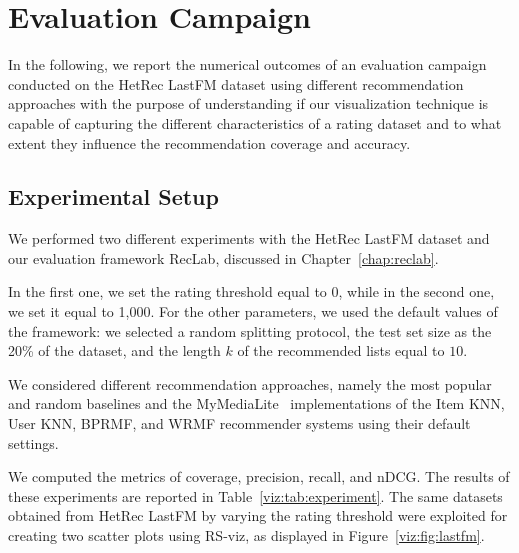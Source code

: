 \section{Evaluation Campaign}
\label{viz:sec:evaluation}

In the following, we report the numerical outcomes of an evaluation campaign conducted on the HetRec LastFM dataset using different recommendation approaches with the purpose of understanding if our visualization technique is capable of capturing the different characteristics of a rating dataset and to what extent they influence the recommendation coverage and accuracy.

\subsection{Experimental Setup}

We performed two different experiments with the HetRec LastFM dataset and our evaluation framework RecLab, discussed in Chapter~\ref{chap:reclab}.

In the first one, we set the rating threshold equal to 0, while in the second one, we set it equal to 1,000. For the other parameters, we used the default values of the framework: we selected a random splitting protocol, the test set size as the 20\% of the dataset, and the length $k$ of the recommended lists equal to $10$.

We considered different recommendation approaches, namely the most popular and random baselines and the MyMediaLite~\cite{Gantner2011} implementations of the Item KNN, User KNN, BPRMF, and WRMF recommender systems using their default settings.

We computed the metrics of coverage, precision, recall, and nDCG. The results of these experiments are reported in Table~\ref{viz:tab:experiment}. The same datasets obtained from HetRec LastFM by varying the rating threshold were exploited for creating two scatter plots using RS-viz, as displayed in Figure~\ref{viz:fig:lastfm}.

